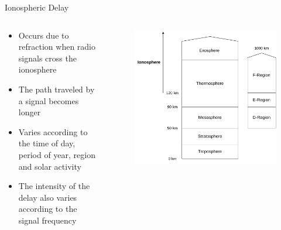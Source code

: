 \begin{frame}{Ionospheric Delay}

    \begin{columns}[t]
        \begin{column}[t]{0.6\textwidth}
            \begin{itemize}
                \item Occurs due to refraction when radio signals cross the ionosphere
                \vspace{0.1cm}
                \item The path traveled by a signal becomes longer
                \vspace{0.1cm}
                \item Varies according to the time of day, period of year, region and solar activity
                \vspace{0.1cm}
                \item The intensity of the delay also varies according to the signal frequency
            \end{itemize}
        \end{column}
        \begin{column}[t]{0.5\textwidth}
            \begin{figure}[!ht]
                \begin{center}
                    \includegraphics[width=\columnwidth]{figures/atmosphere-model}
                \end{center}
            \end{figure}
        \end{column}
    \end{columns}

\end{frame}

